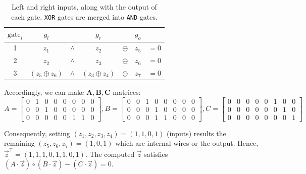 \begin{table}[h]
	\centering
\caption[Left and right inputs and output of gates in the example circuit]{Left and right inputs, along with the output of each gate. \texttt{XOR} gates are merged into \texttt{AND} gates.}

	\begin{tabular}{c c c c c c c}
		\toprule
		\textbf{$\text{gate}_i$} & $g_l$& & $g_r$& & $g_o$ &  \\
		\midrule
		1 & $z_1$& $\wedge$ & $z_2$& $\oplus$ & $z_5$ & $= 0$\\

		2 & $z_2$& $\wedge$ & $z_3$& $\oplus$ & $z_6$ & $= 0$\\

		3 & $(z_5 \oplus z_6)$& $\wedge$ & $( z_3 \oplus z_4)$& $\oplus$ & $z_7$ & $= 0$\\
		\bottomrule
	\end{tabular}
	\label{tab:gates}
\end{table}

Accordingly, we can make $\mathbf{A}, \mathbf{B}, \mathbf{C}$ matrices:
\begin{equation}
	\label{eq:ABC-example}
	A = 
	\begin{bmatrix}
		0 & 1 & 0 & 0 & 0 & 0 & 0 & 0\\
		0 & 0 & 1 & 0 & 0 & 0 & 0 & 0\\
		0 & 0 & 0 & 0 & 0 & 1 & 1 & 0
	\end{bmatrix}, B = 
	\begin{bmatrix}
		0 & 0 & 1 & 0 & 0 & 0 & 0 & 0\\
		0 & 0 & 0 & 1 & 0 & 0 & 0 & 0\\
		0 & 0 & 0 & 1 & 1 & 0 & 0 & 0
	\end{bmatrix},
	 C = 
	\begin{bmatrix}
		0 & 0 & 0 & 0 & 0 & 1 & 0 & 0\\
		0 & 0 & 0 & 0 & 0 & 0 & 1 & 0\\
		0 & 0 & 0 & 0 & 0 & 0 & 0 & 1
	\end{bmatrix}
\end{equation}

Consequently, setting $(z_1, z_2, z_3, z_4) = (1, 1, 0, 1)$ (inputs) results the remaining $(z_5, z_6, z_7) = (1, 0, 1)$ which are internal wires or the output. Hence, $\vec{z}^\intercal=(1, 1, 1, 0, 1, 1, 0, 1)$. The computed $\vec{z}$ satisfies $(A\cdot \vec{z})\circ(B\cdot \vec{z})-(C\cdot \vec{z})=0$.
